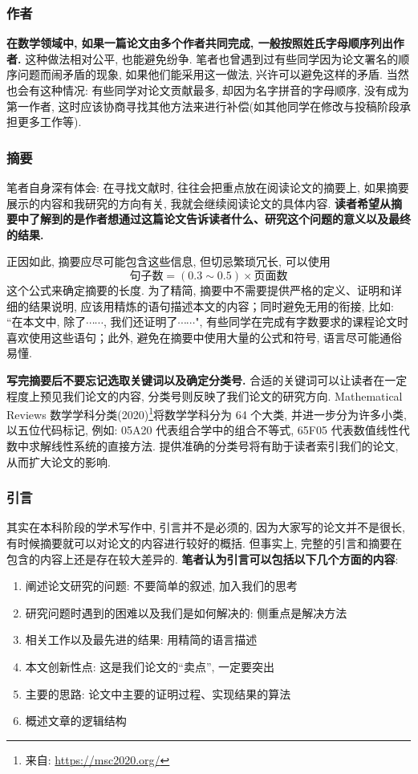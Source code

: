\documentclass{formatBook}
\begin{document}
\subsubsection{作者}
\textbf{在数学领域中, 如果一篇论文由多个作者共同完成, 一般按照姓氏字母顺序列出作者.} 这种做法相对公平, 也能避免纷争. 笔者也曾遇到过有些同学因为论文署名的顺序问题而闹矛盾的现象, 如果他们能采用这一做法, 兴许可以避免这样的矛盾. 当然也会有这种情况: 有些同学对论文贡献最多, 却因为名字拼音的字母顺序, 没有成为第一作者, 这时应该协商寻找其他方法来进行补偿(如其他同学在修改与投稿阶段承担更多工作等). 
\subsubsection{摘要}
笔者自身深有体会: 在寻找文献时, 往往会把重点放在阅读论文的摘要上, 如果摘要展示的内容和我研究的方向有关, 我就会继续阅读论文的具体内容. \textbf{读者希望从摘要中了解到的是作者想通过这篇论文告诉读者什么、研究这个问题的意义以及最终的结果.}\par
正因如此, 摘要应尽可能包含这些信息, 但切忌繁琐冗长, 可以使用 $$\text{句子数}=(0.3 \sim 0.5)\times \text{页面数}$$ 这个公式\cite{pakhow}来确定摘要的长度. 为了精简, 摘要中不需要提供严格的定义、证明和详细的结果说明, 应该用精炼的语句描述本文的内容；同时避免无用的衔接, 比如: “在本文中, 除了$\cdots\cdots$, 我们还证明了$\cdots\cdots$", 有些同学在完成有字数要求的课程论文时喜欢使用这些语句；此外, 避免在摘要中使用大量的公式和符号, 语言尽可能通俗易懂. \par
\textbf{写完摘要后不要忘记选取关键词以及确定分类号.} 合适的关键词可以让读者在一定程度上预见我们论文的内容, 分类号则反映了我们论文的研究方向. Mathematical Reviews 数学学科分类(2020)\footnote{来自: \url{https://msc2020.org/}}将数学学科分为 64 个大类, 并进一步分为许多小类, 以五位代码标记, 例如: 05A20 代表组合学中的组合不等式, 65F05 代表数值线性代数中求解线性系统的直接方法. 提供准确的分类号将有助于读者索引我们的论文, 从而扩大论文的影响.
\subsubsection{引言}
其实在本科阶段的学术写作中, 引言并不是必须的, 因为大家写的论文并不是很长, 有时候摘要就可以对论文的内容进行较好的概括. 但事实上, 完整的引言和摘要在包含的内容上还是存在较大差异的. \textbf{笔者认为引言可以包括以下几个方面的内容}: 
\begin{enumerate}
    \item 阐述论文研究的问题: 不要简单的叙述, 加入我们的思考
    \item 研究问题时遇到的困难以及我们是如何解决的: 侧重点是解决方法
    \item 相关工作以及最先进的结果: 用精简的语言描述
    \item 本文创新性点: 这是我们论文的“卖点”, 一定要突出
    \item 主要的思路: 论文中主要的证明过程、实现结果的算法
    \item 概述文章的逻辑结构
\end{enumerate}
\end{document}
